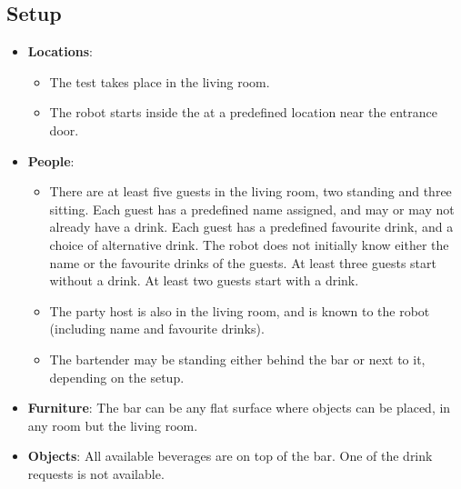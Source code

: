 \subsection*{Setup}
\begin{itemize}
	\item \textbf{Locations}: 
		\begin{itemize} 
			\item The test takes place in the living room.
			\item The robot starts inside the \Arena{} at a predefined location near the entrance door.
		\end{itemize}
	\item \textbf{People}:
		\begin{itemize} 			
			\item There are at least five guests in the living room, two standing and three sitting. Each guest has a predefined name assigned, and may or may not already have a drink. Each guest has a predefined favourite drink, and a choice of alternative drink. The robot does not initially know either the name or the favourite drinks of the guests. At least three guests start without a drink. At least two guests start with a drink.
			\item The party host is also in the living room, and is known to the robot (including name and favourite drinks).
			\item The bartender may be standing either behind the bar or next to it, depending on the \Arena{} setup.
		\end{itemize}
	\item \textbf{Furniture}: The bar can be any flat surface where objects can be placed, in any room but the living room.
	\item \textbf{Objects}: All available beverages are on top of the bar. One of the drink requests is not available.
\end{itemize}

